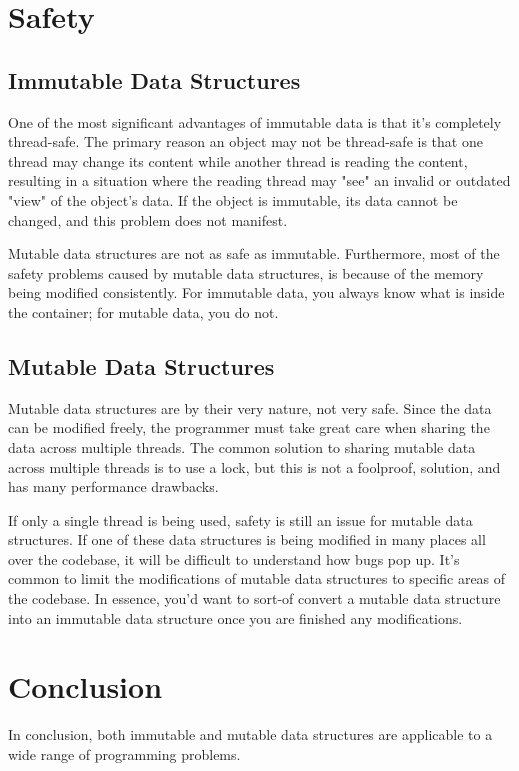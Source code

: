 \documentclass[11pt]{article}
\begin{document}
\section{Safety}
\subsection{Immutable Data Structures}
One of the most significant advantages of immutable data is that it’s
completely thread-safe. The primary reason an object may not be thread-safe is
that one thread may change its content while another thread is reading the
content, resulting in a situation where the reading thread may "see" an invalid
or outdated "view" of the object's data. If the object is immutable, its data
cannot be changed, and this problem does not manifest.

Mutable data structures are not as safe as immutable. Furthermore, most of the
safety problems caused by mutable data structures, is because of the memory
being modified consistently. For immutable data, you always know what is inside
the container; for mutable data, you do not.

\subsection{Mutable Data Structures}
Mutable data structures are by their very nature, not very safe. Since the data
can be modified freely, the programmer must take great care when sharing the
data across multiple threads. The common solution to sharing mutable data
across multiple threads is to use a lock, but this is not a foolproof,
solution, and has many performance drawbacks.

If only a single thread is being used, safety is still an issue for mutable
data structures. If one of these data structures is being modified in many
places all over the codebase, it will be difficult to understand how bugs pop
up. It's common to limit the modifications of mutable data structures to
specific areas of the codebase. In essence, you'd want to sort-of convert a
mutable data structure into an immutable data structure once you are finished
any modifications.
\clearpage

\section*{Conclusion}
In conclusion, both immutable and mutable data structures are applicable to a
wide range of programming problems.
\end{document}
